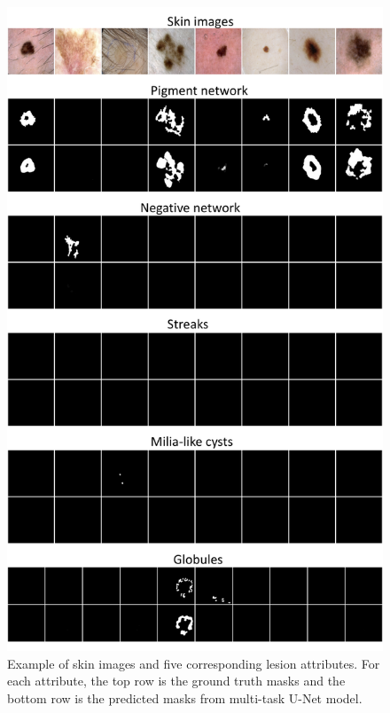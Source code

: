 \documentclass{article}
\begin{document}
\begin{figure}[t]
\begin{minipage}[!ht]{1.0\linewidth}
  \centering
  \centerline{\includegraphics[scale=0.45,trim=0 20 0 20]{skin.png}}
\end{minipage}
\caption{Example of skin images and five corresponding lesion attributes. For each attribute, the top row is the ground truth masks and the bottom row is the predicted masks from multi-task U-Net model.}
\label{fig:res}
\end{figure}
\end{document}

